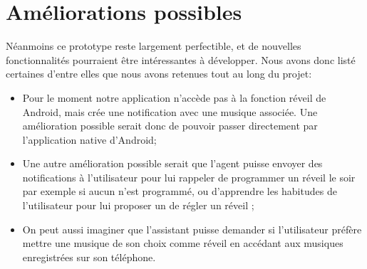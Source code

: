 {\section{Améliorations possibles}
Néanmoins ce prototype reste largement perfectible, et de nouvelles fonctionnalités pourraient être intéressantes à développer. Nous avons donc listé certaines d'entre elles que nous avons retenues tout au long du projet:
\begin{itemize}
	\item Pour le moment notre application n'accède pas à la fonction réveil de Android, mais crée une notification avec une musique associée. Une amélioration possible serait donc de pouvoir passer directement par l'application native d'Android;
	\item Une autre amélioration possible serait que l'agent puisse envoyer des notifications à l'utilisateur pour lui rappeler de programmer un réveil le soir par exemple si aucun n'est programmé, ou d'apprendre les habitudes de l'utilisateur pour lui proposer un de régler un réveil ;
	\item On peut aussi imaginer que l'assistant puisse demander si l'utilisateur préfère mettre une musique de son choix comme réveil en accédant aux musiques enregistrées sur son téléphone.
\end{itemize}
}
